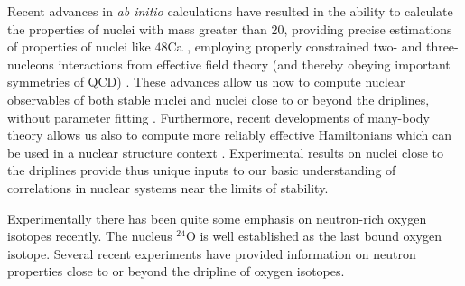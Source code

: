 \documentclass[prc,preprint,superscriptaddress,showpacs,floatfix]{revtex4-1}
\begin{document}
Recent advances in {\em ab initio} calculations have resulted in the
ability to calculate the properties of nuclei with mass greater than
20, providing precise estimations of properties of nuclei like
${48}$Ca \cite{naturephysics2015}, employing properly constrained two-
and three-nucleons interactions from effective field theory (and
thereby obeying important symmetries of QCD) \cite{ekstrom2015}. These
advances allow us now to compute nuclear observables of both stable
nuclei and nuclei close to or beyond the driplines, without parameter
fitting \cite{physicascripta2016}. 
Furthermore, recent developments of many-body theory allows us also to compute
more reliably effective Hamiltonians which can be used in a nuclear structure
context \cite{bogner2014,jansen2014,jansen2015}. 
Experimental results on nuclei
close to the driplines provide thus unique inputs to our basic
understanding of correlations in nuclear systems near the limits of
stability.

Experimentally there has been quite some emphasis on neutron-rich
oxygen isotopes recently.  The nucleus $^{24}$O is well established as
the last bound oxygen isotope. Several recent experiments have
provided information on neutron properties close to or beyond the
dripline of oxygen isotopes.
\end{document}
